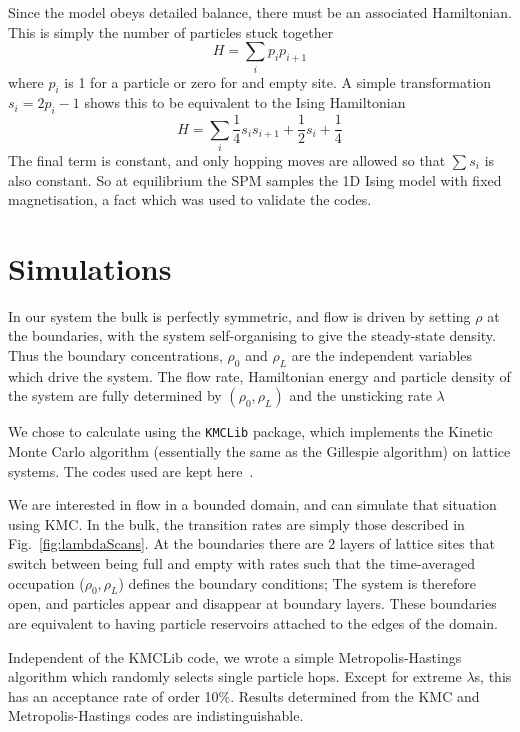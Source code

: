 \documentclass[
reprint, amsmath,amssymb,
]{revtex4-1}
\begin{document}
Since the model obeys detailed balance, there must be an associated
Hamiltonian.  This is simply the number of particles stuck together
\[ H = \sum_i p_ip_{i+1} \]
where $p_i$ is 1 for a particle or zero for and empty site.  A simple
transformation $s_i = 2p_i-1$ shows this to be equivalent to the Ising
Hamiltonian
\[ H = \sum_i \frac{1}{4} s_is_{i+1} + \frac{1}{2} s_i + \frac{1}{4}\]
The final term is constant, and only hopping moves are allowed so that
$\sum s_i$ is also constant. So at equilibrium the SPM samples the 1D
Ising model with fixed magnetisation, a fact which was used to
validate the codes.


\section{Simulations}

 In our system the bulk is perfectly symmetric, and flow is driven by
 setting $\rho$ at the boundaries, with the system self-organising to
 give the steady-state density. Thus the boundary concentrations,
 $\rho_0$ and $\rho_L$ are the independent variables which drive the
 system.  The flow rate, Hamiltonian energy and particle density of the system are fully determined by  $(\rho_0, \rho_L)$ and the unsticking rate $\lambda$


  We chose to calculate using the \texttt{KMCLib}\cite{leetmaa2014kmclib}
 package, which implements the Kinetic Monte Carlo algorithm
 (essentially the same as the Gillespie algorithm\cite{Gillespie1977,
   Bortz1975, Prados1997}) on lattice systems. The codes used are kept
 here~\cite{jHellGitRepo}.

We are interested in flow in a bounded domain, and can simulate that
situation using KMC. In the bulk, the transition rates are simply
those described in Fig.~\ref{fig:lambdaScans}. At the boundaries there
are 2 layers of lattice sites that switch between being full and empty
with rates such that the time-averaged occupation ($\rho_0, \rho_L$)
defines the boundary conditions; The system is therefore open, and
particles appear and disappear at boundary layers.  These boundaries
are equivalent to having particle reservoirs attached to the edges of the
domain.

Independent of the KMCLib code, we wrote a simple Metropolis-Hastings
algorithm which randomly selects single particle hops.  Except for
extreme $\lambda$s, this has an acceptance rate of order 10\%. Results
determined from the KMC and Metropolis-Hastings codes are
indistinguishable.
\end{document}
